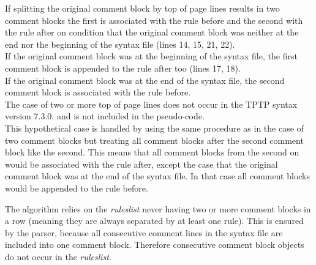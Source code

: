 If splitting the original comment block by top of page lines results in two comment blocks the first is associated with the rule before and the second with the rule after on condition that the original comment block was neither at the end nor the beginning of the syntax file (lines 14, 15, 21, 22).\\
If the original comment block was at the beginning of the syntax file, the first comment block is appended to the rule 
after too (lines 17, 18).\\
If the original comment block was at the end of the syntax file, the second comment block is associated with the rule before.\\
The case of two or more top of page lines does not occur in the \ac{TPTP} syntax version 7.3.0. and is not included in the pseudo-code.\\
This hypothetical case is handled by using the same procedure as in the case of two comment blocks but treating all comment blocks after the second comment block like the second. This means that all comment blocks from the second on would be associated with the rule after, except the case that the original comment block was at the end of the syntax file. In that case all comment blocks would be appended to the rule before.

The algorithm relies on the \textit{rules\textunderscore list} never having two or more comment blocks in a row (meaning they are always separated by at least one rule). This is ensured by the parser, because all consecutive comment lines in the syntax file are included into one comment block. Therefore consecutive comment block objects do not occur in the \textit{rules\textunderscore list}.

